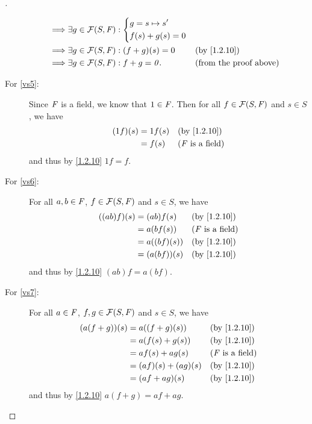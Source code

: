 \begin{proof}[]
\begin{description}
\begin{align*}
				\implies & \exists g \in \FS : \begin{dcases}
					g = s \mapsto s' \\
					f(s) + g(s) = 0
				\end{dcases}                                        \\
				\implies & \exists g \in \FS : (f + g)(s) = 0                 &  & \text{(by \cref{1.2.10})}     \\
				\implies & \exists g \in \FS : f + g = \zv.                   &  & \text{(from the proof above)}
			\end{align*}
		\item[For \ref{vs5}:]
			Since \(\mathit{F}\) is a field, we know that \(1 \in \mathit{F}\).
			Then for all \(f \in \FS\) and \(s \in S\), we have
			\begin{align*}
				(1f)(s) & = 1f(s) &  & \text{(by \cref{1.2.10})}  \\
				        & = f(s)  &  & \text{(\(\F\) is a field)}
			\end{align*}
			and thus by \cref{1.2.10} \(1f = f\).
		\item[For \ref{vs6}:]
			For all \(a, b \in \mathit{F}\), \(f \in \FS\) and \(s \in S\), we have
			\begin{align*}
				((ab) f)(s) & = (ab) f(s)   &  & \text{(by \cref{1.2.10})}  \\
				            & = a (b f(s))  &  & \text{(\(\F\) is a field)} \\
				            & = a ((bf)(s)) &  & \text{(by \cref{1.2.10})}  \\
				            & = (a (bf))(s) &  & \text{(by \cref{1.2.10})}
			\end{align*}
			and thus by \cref{1.2.10} \((ab) f = a (bf)\).
		\item[For \ref{vs7}:]
			For all \(a \in \mathit{F}\), \(f, g \in \FS\) and \(s \in S\), we have
			\begin{align*}
				(a (f + g))(s) & = a ((f + g)(s))    &  & \text{(by \cref{1.2.10})}  \\
				               & = a (f(s) + g(s))   &  & \text{(by \cref{1.2.10})}  \\
				               & = af(s) + ag(s)     &  & \text{(\(\F\) is a field)} \\
				               & = (af)(s) + (ag)(s) &  & \text{(by \cref{1.2.10})}  \\
				               & = (af + ag)(s)      &  & \text{(by \cref{1.2.10})}
			\end{align*}
			and thus by \cref{1.2.10} \(a (f + g) = af + ag\).

\end{description}
\end{proof}
